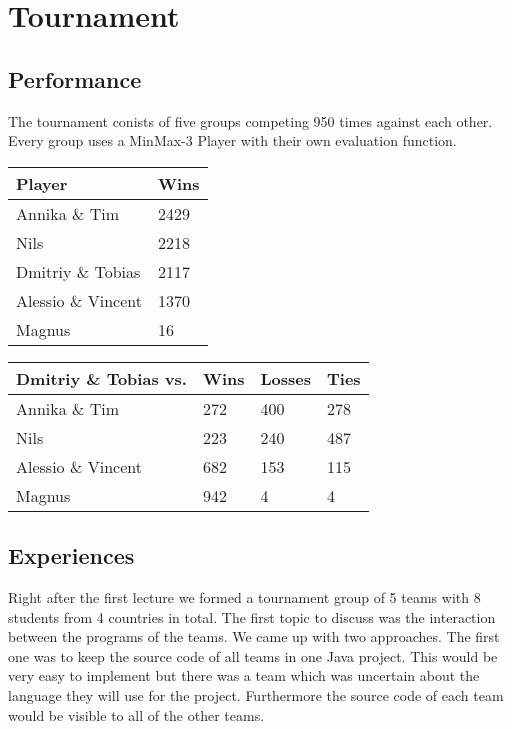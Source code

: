 \chapter{Tournament}
\label{ch:tournament}
\section{Performance}
The tournament conists of five groups competing 950 times against each other. Every group uses a MinMax-3 Player with their own evaluation function.
\begin{table}[h]
	\centering
	\begin{tabular}[h]{l|l}
		\textbf{Player} & \textbf{Wins}\\
		\hline
		Annika \& Tim & 2429 \\
		Nils & 2218 \\
		Dmitriy \& Tobias & 2117 \\
		Alessio \& Vincent & 1370 \\
		Magnus & 16 \\
	\end{tabular}
\end{table}
\begin{table}[h]
	\centering
	\begin{tabular}[h]{l|l|l|l}
		\textbf{Dmitriy \& Tobias vs.} & \textbf{Wins} & \textbf{Losses} & \textbf{Ties}\\
		\hline
		Annika \& Tim & 272 & 400 & 278\\
		Nils & 223 & 240 & 487\\
		Alessio \& Vincent & 682 & 153 & 115\\
		Magnus & 942 & 4 & 4\\
	\end{tabular}
\end{table}
\section{Experiences}
Right after the first lecture we formed a tournament group of 5 teams with 8 students from 4 countries in total. The first topic to discuss was the interaction between the programs of the teams. We came up with two approaches. The first one was to keep the source code of all teams in one Java project. This would be very easy to implement but there was a team which was uncertain about the language they will use for the project. Furthermore the source code of each team would be visible to all of the other teams.

